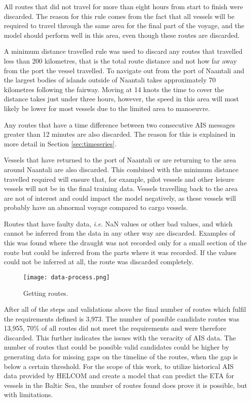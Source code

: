 \documentclass[../main.tex]{subfiles}
\begin{document}
All routes that did not travel for more than eight hours from start to finish were discarded. The reason for this rule comes from the fact that all vessels will be required to travel through the same area for the final part of the voyage, and the model should perform well in this area, even though these routes are discarded.

A minimum distance travelled rule was used to discard any routes that travelled less than 200 kilometres, that is the total route distance and not how far away from the port the vessel travelled. To navigate out from the port of Naantali and the largest bodies of islands outside of Naantali takes approximately 70 kilometres following the fairway. Moving at 14 knots the time to cover the distance takes just under three hours, however, the speed in this area will most likely be lower for most vessels due to the limited area to manoeuvre.

Any routes that have a time difference between two consecutive AIS messages greater than 12 minutes are also discarded. The reason for this is explained in more detail in Section \ref{sec:timeseries}.

Vessels that have returned to the port of Naantali or are returning to the area around Naantali are also discarded. This combined with the minimum distance travelled required will ensure that, for example, pilot vessels and other leisure vessels will not be in the final training data. Vessels travelling back to the area are not of interest and could impact the model negatively, as these vessels will probably have an abnormal voyage compared to cargo vessels.

Routes that have faulty data, \textit{i.e.} NaN values or other bad values, and which cannot be inferred from the data in any other way are discarded. Examples of this was found where the draught was not recorded only for a small section of the route but could be inferred from the parts where it was recorded. If the values could not be inferred at all, the route was discarded completely.

\begin{figure}[H]
	\centering
	\texttt{[image: data-process.png]}
	\caption{Getting routes.}
	\label{fig:flowchart}
\end{figure}

After all of the steps and validations above the final number of routes which fulfil the requirements defined is 3,973. The number of possible candidate routes was 13,955, 70\% of all routes did not meet the requirements and were therefore discarded. This further indicates the issues with the veracity of AIS data. The number of routes that could be possible valid candidates could be higher by generating data for missing gaps on the timeline of the routes, when the gap is below a certain threshold. For the scope of this work, to utilize historical AIS data provided by HELCOM and create a model that can predict the ETA for vessels in the Baltic Sea, the number of routes found does prove it is possible, but with limitations.
\end{document}
